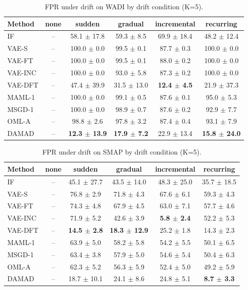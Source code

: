 \begin{table}[t]
\centering
\small
\caption{FPR under drift on WADI by drift condition (K=5).}
\label{tab:drift_fpr_drift_wadi}
\begin{tabular}{lccccc}
\toprule
Method & none & sudden & gradual & incremental & recurring \\
\midrule
IF & – & 58.1 $\pm$ 17.8 & 59.3 $\pm$ 8.5 & 69.9 $\pm$ 18.4 & 48.2 $\pm$ 12.4 \\
VAE-S & – & 100.0 $\pm$ 0.0 & 99.5 $\pm$ 0.1 & 87.7 $\pm$ 0.3 & 100.0 $\pm$ 0.0 \\
VAE-FT & – & 100.0 $\pm$ 0.0 & 99.5 $\pm$ 0.1 & 88.0 $\pm$ 0.2 & 100.0 $\pm$ 0.0 \\
VAE-INC & – & 100.0 $\pm$ 0.0 & 93.0 $\pm$ 5.8 & 87.3 $\pm$ 0.2 & 100.0 $\pm$ 0.0 \\
VAE-DFT & – & 47.4 $\pm$ 39.9 & 31.5 $\pm$ 13.0 & \textbf{12.4 $\pm$ 4.5} & 21.9 $\pm$ 37.3 \\
MAML-1 & – & 100.0 $\pm$ 0.0 & 99.1 $\pm$ 0.5 & 87.6 $\pm$ 0.1 & 95.0 $\pm$ 5.3 \\
MSGD-1 & – & 100.0 $\pm$ 0.0 & 98.9 $\pm$ 0.7 & 87.6 $\pm$ 0.2 & 92.9 $\pm$ 7.7 \\
OML-A & – & 98.8 $\pm$ 2.6 & 97.8 $\pm$ 3.2 & 87.4 $\pm$ 0.4 & 93.1 $\pm$ 7.9 \\
DAMAD & – & \textbf{12.3 $\pm$ 13.9} & \textbf{17.9 $\pm$ 7.2} & 22.9 $\pm$ 13.4 & \textbf{15.8 $\pm$ 24.0} \\
\bottomrule
\end{tabular}
\end{table}

\begin{table}[t]
\centering
\small
\caption{FPR under drift on SMAP by drift condition (K=5).}
\label{tab:drift_fpr_drift_smap}
\begin{tabular}{lccccc}
\toprule
Method & none & sudden & gradual & incremental & recurring \\
\midrule
IF & – & 45.1 $\pm$ 27.7 & 43.5 $\pm$ 14.0 & 48.3 $\pm$ 25.0 & 35.7 $\pm$ 18.5 \\
VAE-S & – & 76.8 $\pm$ 2.9 & 71.8 $\pm$ 4.3 & 67.6 $\pm$ 6.1 & 59.3 $\pm$ 4.3 \\
VAE-FT & – & 74.3 $\pm$ 4.8 & 67.9 $\pm$ 4.5 & 63.0 $\pm$ 7.1 & 57.7 $\pm$ 4.6 \\
VAE-INC & – & 71.9 $\pm$ 5.2 & 42.6 $\pm$ 3.9 & \textbf{5.8 $\pm$ 2.4} & 52.2 $\pm$ 5.3 \\
VAE-DFT & – & \textbf{14.5 $\pm$ 2.8} & \textbf{18.3 $\pm$ 12.9} & 25.2 $\pm$ 1.8 & 14.3 $\pm$ 2.3 \\
MAML-1 & – & 63.9 $\pm$ 5.0 & 58.2 $\pm$ 5.8 & 54.2 $\pm$ 5.5 & 50.1 $\pm$ 6.5 \\
MSGD-1 & – & 63.4 $\pm$ 3.8 & 57.9 $\pm$ 5.0 & 54.6 $\pm$ 5.4 & 50.4 $\pm$ 6.3 \\
OML-A & – & 62.3 $\pm$ 5.2 & 56.3 $\pm$ 5.9 & 52.4 $\pm$ 5.0 & 49.2 $\pm$ 5.9 \\
DAMAD & – & 18.7 $\pm$ 10.1 & 24.1 $\pm$ 8.6 & 24.8 $\pm$ 5.1 & \textbf{8.7 $\pm$ 3.3} \\
\bottomrule
\end{tabular}
\end{table}


